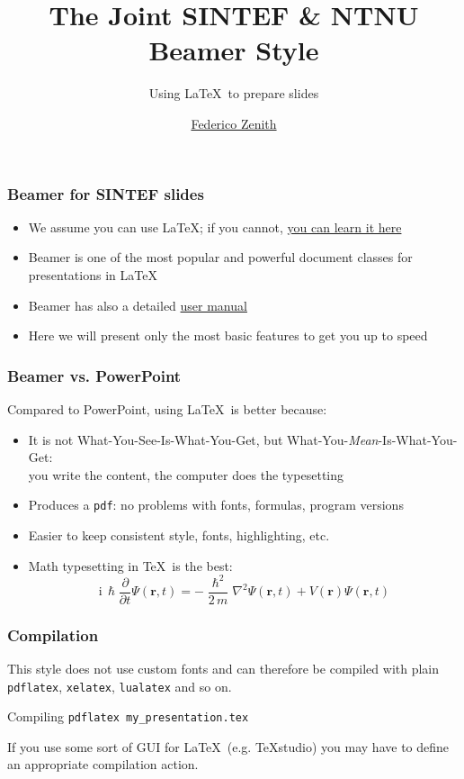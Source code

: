 \documentclass{beamer}
\title{The Joint SINTEF \& NTNU Beamer Style}
\subtitle{Using \LaTeX\ to prepare slides}
\author{\href{mailto:federico.zenith@sintef.no}{Federico Zenith}}
\institute{Department of Proper Typesetting}
\newcommand{\hrefcol}[2]{\textcolor{cyan}{\href{#1}{#2}}}
\begin{document}
\maketitle

\begin{frame}
\frametitle{Beamer for SINTEF slides}
\begin{itemize}
\item We assume you can use \LaTeX; if you cannot,
\hrefcol{http://en.wikibooks.org/wiki/LaTeX/}{you can learn it here}
\item Beamer is one of the most popular and powerful document
classes for presentations in \LaTeX
\item Beamer has also a detailed
      \hrefcol{http://www.ctan.org/tex-archive/macros/latex/contrib/beamer/doc/beameruserguide.pdf}{user manual}
\item Here we will present only the most basic features to get you up to speed
\end{itemize}
\end{frame}

\begin{frame}
\frametitle{Beamer vs. PowerPoint}
Compared to PowerPoint, using \LaTeX\ is better because:
\begin{itemize}
\item It is not What-You-See-Is-What-You-Get, but
What-You-\emph{Mean}-Is-What-You-Get:\\
you write the content, the computer does the typesetting
\item Produces a \texttt{pdf}: no problems with fonts, formulas, program versions
\item Easier to keep consistent style, fonts, highlighting, etc.
\item Math typesetting in \TeX\ is the best:
\begin{equation*}
\mathrm{i}\,\hslash\frac{\partial}{\partial t} \Psi(\mathbf{r},t) =
-\frac{\hslash^2}{2\,m}\nabla^2\Psi(\mathbf{r},t)
+ V(\mathbf{r})\Psi(\mathbf{r},t)
\end{equation*}

\end{itemize}
\end{frame}

\begin{frame}[fragile]
\frametitle{Compilation}
This style does not use custom fonts and can therefore be compiled with plain
\texttt{pdflatex}, \texttt{xelatex}, \texttt{lualatex} and so on.

\begin{block}{Compiling}
\verb|pdflatex my_presentation.tex|
\end{block}

If you use some sort of GUI for \LaTeX\ (e.g. \TeX{}studio) you may have to
define an appropriate compilation action.

\end{frame}
\end{document}
